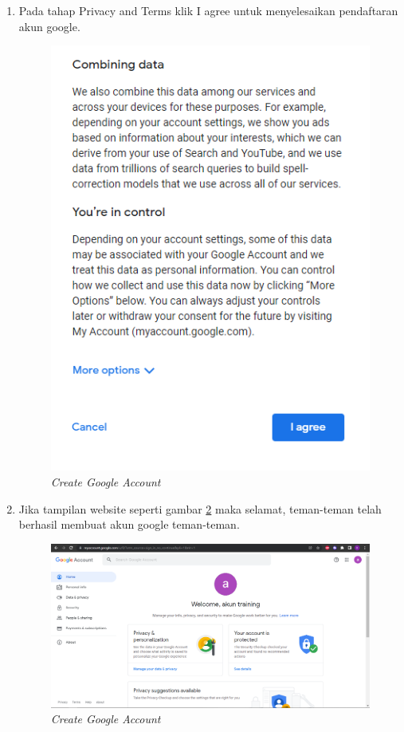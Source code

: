 \begin{enumerate}
\item Pada tahap Privacy and Terms klik I agree untuk menyelesaikan pendaftaran akun google.
\begin{figure}[H]
    \centering
    \includegraphics[scale=0.5]{figures/google7}
    \caption{\textit{Create Google Account}}
    \label{google7}
\end{figure}

\item Jika tampilan website seperti gambar \ref{google8} maka selamat, teman-teman telah berhasil membuat akun google teman-teman.
\begin{figure}[H]
    \centering
    \includegraphics[scale=0.35]{figures/google8}
    \caption{\textit{Create Google Account}}
    \label{google8}
\end{figure}

\end{enumerate}

